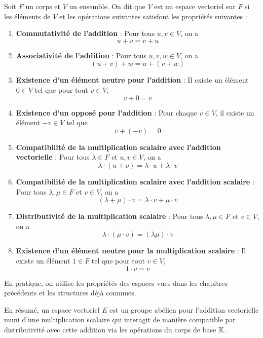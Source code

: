 \begin{definition}
    Soit \( F \) un corps et \( V \) un ensemble. On dit que \( V \) est un espace vectoriel sur \( F \) si les éléments de \( V \) et les opérations suivantes satisfont les propriétés suivantes :

    \begin{enumerate}
        \item \textbf{Commutativité de l'addition} : Pour tous \( u, v \in V \), on a
            \[ u + v = v + u\]
        \item \textbf{Associativité de l'addition} : Pour tous \( u, v, w \in V \), on a
            \[ (u + v) + w = u + (v + w) \]
        \item \textbf{Existence d'un élément neutre pour l'addition} : Il existe un élément \( 0 \in V \) tel que pour tout \( v \in V \),
            \[ v + 0 = v \]
        \item \textbf{Existence d'un opposé pour l'addition} : Pour chaque \( v \in V \), il existe un élément \( -v \in V \) tel que
            \[ v + (-v) = 0 \]
        \item \textbf{Compatibilité de la multiplication scalaire avec l'addition vectorielle} : Pour tous \( \lambda \in F \) et \( u, v \in V \), on a
            \[ \lambda \cdot (u + v) = \lambda \cdot u + \lambda \cdot v \]
        \item \textbf{Compatibilité de la multiplication scalaire avec l'addition scalaire} : Pour tous \( \lambda, \mu \in F \) et \( v \in V \), on a
            \[ (\lambda + \mu) \cdot v = \lambda \cdot v + \mu \cdot v\]
        \item \textbf{Distributivité de la multiplication scalaire} : Pour tous \( \lambda, \mu \in F \) et \( v \in V \), on a
            \[ \lambda \cdot (\mu \cdot v) = (\lambda \mu) \cdot v \]
        \item \textbf{Existence d'un élément neutre pour la multiplication scalaire} : Il existe un élément \( 1 \in F \) tel que pour tout \( v \in V \),
            \[ 1 \cdot v = v \]
    \end{enumerate}
\end{definition}

En pratique, on utilise les propriétés des espaces vues dans les chapitres précédents et les structures 
déjà connnues. 

\begin{definition}
    En résumé, un espace vectoriel $E$ est un groupe abélien pour l'addition vectorielle muni d'une multiplication 
    scalaire qui interagit de manière compatible par distributivité avec cette addition via les opérations du corps 
    de base $\mathbb{K}$.  
\end{definition}

